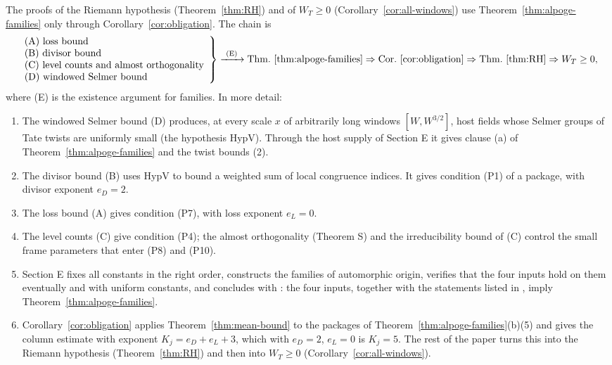 \documentclass[10pt]{amsart}
\theoremstyle{definition}
\theoremstyle{remark}
\begin{document}
The proofs of the Riemann hypothesis (Theorem~\ref{thm:RH}) and of
$W_T\ge0$ (Corollary~\ref{cor:all-windows}) use
Theorem~\ref{thm:alpoge-families} only through
Corollary~\ref{cor:obligation}. The chain is
\[
\left.\begin{array}{l}
\text{(A) loss bound}\\
\text{(B) divisor bound}\\
\text{(C) level counts and almost orthogonality}\\
\text{(D) windowed Selmer bound}
\end{array}\right\}
\xrightarrow{\ \text{(E)}\ }
\text{Thm.~\ref{thm:alpoge-families}}
\Rightarrow
\text{Cor.~\ref{cor:obligation}}
\Rightarrow
\text{Thm.~\ref{thm:RH}}
\Rightarrow
W_T\ge0 ,
\]
where (E) is the existence argument for families.
In more detail:
\begin{enumerate}
\item The windowed Selmer bound (D) produces, at every scale $x$ of
arbitrarily long windows $[W,W^{3/2}]$, host fields whose Selmer groups of
Tate twists are uniformly small (the hypothesis $\mathrm{HypV}$). Through
the host supply of Section E it gives clause (a) of
Theorem~\ref{thm:alpoge-families} and the twist bounds (2).
\item The divisor bound (B) uses $\mathrm{HypV}$ to bound a weighted sum of
local congruence indices. It gives condition (P1) of a package, with
divisor exponent $e_D=2$.
\item The loss bound (A) gives condition (P7), with loss exponent
$e_L=0$.
\item The level counts (C) give condition (P4); the almost orthogonality
(Theorem S) and the irreducibility bound of (C) control the small frame
parameters that enter (P8) and (P10).
\item Section E fixes all constants in the right order, constructs the
families of automorphic origin, verifies that the four inputs hold on
them eventually and with uniform constants, and concludes with
\cite[Theorem~\ref{A-i4:thm-final}]{Annex}: the four inputs, together with
the statements listed in \cite[Remark~\ref{A-i4:rem-trust}]{Annex}, imply
Theorem~\ref{thm:alpoge-families}.
\item Corollary~\ref{cor:obligation} applies Theorem~\ref{thm:mean-bound} to
the packages of Theorem~\ref{thm:alpoge-families}(b)(5) and gives the
column estimate with exponent $K_j=e_D+e_L+3$, which with $e_D=2$, $e_L=0$
is $K_j=5$. The rest of the paper turns this into the Riemann hypothesis
(Theorem~\ref{thm:RH}) and then into $W_T\ge0$
(Corollary~\ref{cor:all-windows}).
\end{enumerate}
\end{document}
